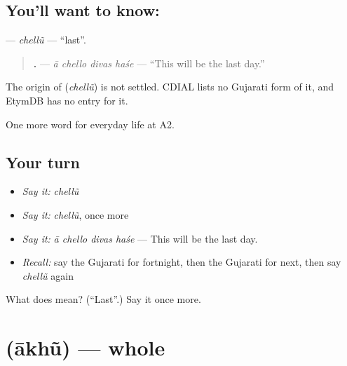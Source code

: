 \subsection*{You'll want to know: }
\textbf{} — \emph{chellũ} — \textquotedblleft{}last\textquotedblright{}.

\begin{quote}
\textbf{   .} — \emph{ā chello divas haśe} — \textquotedblleft{}This will be the last day.\textquotedblright{}
\end{quote}

\begin{cousinweb}
The origin of \textbf{} (\emph{chellũ}) is not settled. CDIAL lists no Gujarati form of it, and EtymDB has no entry for it.
\end{cousinweb}

\begin{grammarlens}[title={What you've built}]
One more word for everyday life at A2.
\end{grammarlens}

\subsection*{Your turn}
\begin{itemize}
\raggedright
  \item \emph{Say it:} \emph{chellũ}
  \item \emph{Say it:} \emph{chellũ}, once more
  \item \emph{Say it:} \emph{ā chello divas haśe} — This will be the last day.
  \item \emph{Recall:} say the Gujarati for fortnight, then the Gujarati for next, then say \emph{chellũ} again
\end{itemize}

\begin{tcolorbox}[breakable,colback=teal!4,colframe=teal!35!black,title={Before you move on}]
What does  mean? (\textquotedblleft{}Last\textquotedblright{}.) Say it once more.
\end{tcolorbox}
\section[\texorpdfstring{\gu{આખું} (ākhũ)}{આખું (ākhũ)}]{ (ākhũ) — whole}

\label{lesson:GU-C173-akhu}



